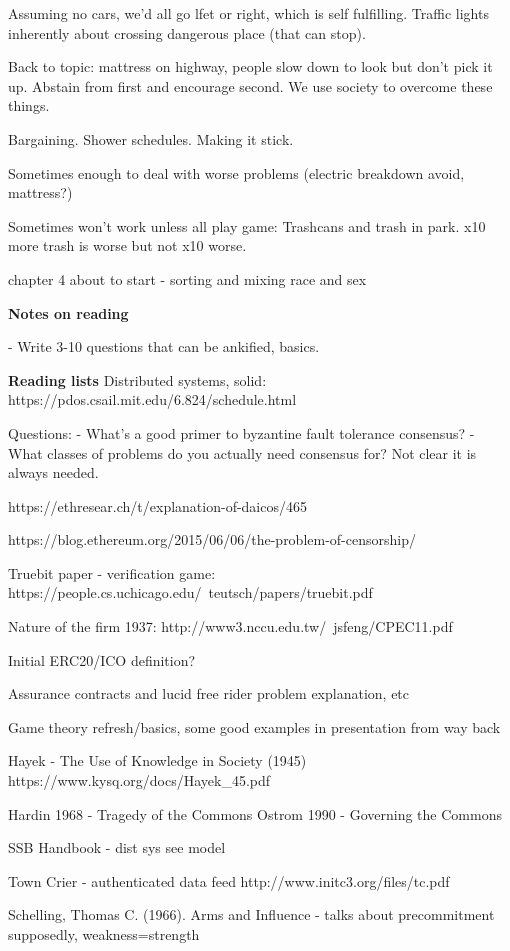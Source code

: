 \documentclass[12pt]{report}
\begin{document}
Assuming no cars, we'd all go lfet or right, which is self fulfilling. Traffic
lights inherently about crossing dangerous place (that can stop).

Back to topic: mattress on highway, people slow down to look but don't pick it
up. Abstain from first and encourage second. We use society to overcome these
things.

Bargaining. Shower schedules. Making it stick.

Sometimes enough to deal with worse problems (electric breakdown avoid, mattress?)

Sometimes won't work unless all play game: Trashcans and trash in park. x10 more
trash is worse but not x10 worse.

chapter 4 about to start - sorting and mixing race and sex

\textbf{Notes on reading}

- Write 3-10 questions that can be ankified, basics.


\textbf{Reading lists}
Distributed systems, solid: https://pdos.csail.mit.edu/6.824/schedule.html


Questions:
- What's a good primer to byzantine fault tolerance consensus?
- What classes of problems do you actually need consensus for? Not clear it is always needed.

https://ethresear.ch/t/explanation-of-daicos/465

https://blog.ethereum.org/2015/06/06/the-problem-of-censorship/

Truebit paper - verification game: https://people.cs.uchicago.edu/~teutsch/papers/truebit.pdf

Nature of the firm 1937: http://www3.nccu.edu.tw/~jsfeng/CPEC11.pdf

Initial ERC20/ICO definition?

Assurance contracts and lucid free rider problem explanation, etc

Game theory refresh/basics, some good examples in presentation from way back

Hayek - The Use of Knowledge in Society (1945) https://www.kysq.org/docs/Hayek_45.pdf

Hardin 1968 - Tragedy of the Commons
Ostrom 1990 - Governing the Commons

SSB Handbook - dist sys see model

Town Crier - authenticated data feed http://www.initc3.org/files/tc.pdf

Schelling, Thomas C. (1966). Arms and Influence - talks about precommitment supposedly, weakness=strength
\end{document}
